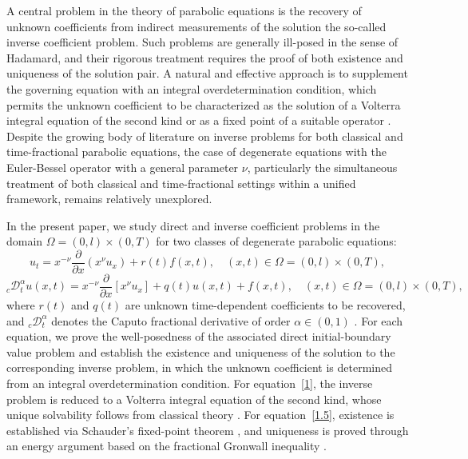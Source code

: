 \documentclass[reqno]{amsart}
\theoremstyle{definition}
\numberwithin{equation}{section}
\begin{document}
A central problem in the theory of parabolic equations is the recovery of unknown
coefficients from indirect measurements of the solution  the so-called inverse
coefficient problem. Such problems are generally ill-posed in the sense of Hadamard,
and their rigorous treatment requires the proof of both existence and uniqueness of the
solution pair. A natural and effective approach is to supplement the governing equation
with an integral overdetermination condition, which permits the unknown coefficient to
be characterized as the solution of a Volterra integral equation of the second kind or
as a fixed point of a suitable operator \cite{Pedas,Zeidler}. Despite the growing body of
literature on inverse problems for both classical and time-fractional parabolic
equations, the case of degenerate equations with the Euler-Bessel operator with a general parameter $\nu$, particularly the simultaneous treatment of both classical and time-fractional settings within a unified framework, remains relatively unexplored.
 
In the present paper, we study direct and inverse coefficient problems in the domain
$\Omega = (0,l)\times(0,T)$ for two classes of degenerate parabolic equations:
\begin{equation}\label{1}
u_t = x^{-\nu}\frac{\partial}{\partial x}\left(x^{\nu}u_x\right) +r(t) f(x,t),\quad(x, t) \in \Omega=(0,l) \times(0, T),
\end{equation}
\begin{equation}\label{1.5}
    _c\mathcal{D}_t^\alpha u(x,t)=x^{-\nu}\frac{\partial}{\partial x}\left[x^{\nu}u_x\right]+q(t)u(x,t)+f(x,t), \quad (x, t) \in \Omega=(0,l) \times(0, T),
\end{equation}
where $r(t)$ and $q(t)$ are unknown time-dependent coefficients to be recovered, and
${}_{c}\mathcal{D}_t^{\alpha}$ denotes the Caputo fractional derivative of order
$\alpha\in(0,1)$ \cite{Podlubny}. For each equation, we prove the well-posedness of the
associated direct initial-boundary value problem and establish the existence and
uniqueness of the solution to the corresponding inverse problem, in which the unknown
coefficient is determined from an integral overdetermination condition. For
equation~\eqref{1}, the inverse problem is reduced to a Volterra integral equation
of the second kind, whose unique solvability follows from classical theory \cite{Pedas}.
For equation~\eqref{1.5}, existence is established via Schauder's fixed-point
theorem \cite{Zeidler}, and uniqueness is proved through an energy argument based on the
fractional Gronwall inequality \cite{Ye2007}.
 
\end{document}
